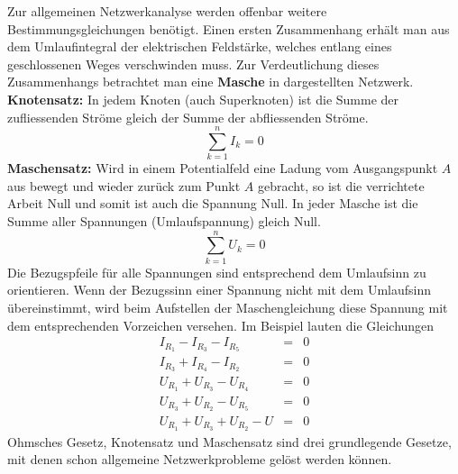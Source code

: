 \noindent Zur allgemeinen Netzwerkanalyse werden offenbar weitere Bestimmungsgleichungen benötigt. Einen ersten Zusammenhang erhält man aus dem Umlaufintegral der elektrischen Feldstärke, welches entlang eines geschlossenen Weges verschwinden muss. Zur Verdeutlichung dieses Zusammenhangs betrachtet man eine \textbf{Masche} in dargestellten Netzwerk.
\newline\newline
\textbf{Knotensatz:} In jedem Knoten (auch Superknoten) ist die Summe der zufliessenden Ströme gleich der Summe der abfliessenden Ströme.
\begin{equation}
\boxed{\displaystyle \sum_{k=1}^nI_k=0}
\end{equation}
\textbf{Maschensatz:} Wird in einem Potentialfeld eine Ladung vom Ausgangspunkt $A$ aus bewegt und wieder zurück zum Punkt $A$ gebracht, so ist die verrichtete Arbeit Null und somit ist auch die Spannung Null. In jeder Masche ist die Summe aller Spannungen (Umlaufspannung) gleich Null.
\begin{equation}
\boxed{\displaystyle \sum_{k=1}^nU_k=0}
\end{equation}
Die Bezugspfeile für alle Spannungen sind entsprechend dem Umlaufsinn zu orientieren. Wenn der Bezugssinn einer Spannung nicht mit dem Umlaufsinn übereinstimmt, wird beim Aufstellen der Maschengleichung diese Spannung mit dem entsprechenden Vorzeichen versehen.
\newline\newline
Im Beispiel lauten die Gleichungen
\begin{equation}
\begin{array}{lll}
I_{R_1}-I_{R_3}-I_{R_5}&=&0\\
I_{R_3}+I_{R_4}-I_{R_2}&=&0\\
U_{R_1}+U_{R_3}-U_{R_4}&=&0\\
U_{R_3}+U_{R_2}-U_{R_5}&=&0\\
U_{R_1}+U_{R_3}+U_{R_2}-U&=&0
\end{array}
\end{equation}
\newline\newline
Ohmsches Gesetz, Knotensatz und Maschensatz sind drei grundlegende Gesetze, mit denen schon allgemeine Netzwerkprobleme gelöst werden können.
